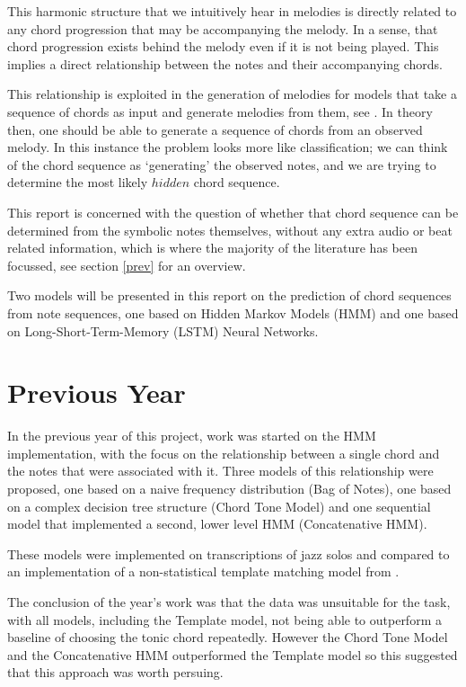 \documentclass[bsc,singlespacing,logo, parskip, deptreport]{infthesis}
\begin{document}
This harmonic structure that we intuitively hear in melodies is directly related to any chord progression that may be accompanying the melody. In a sense, that chord progression exists behind the melody even if it is not being played. This implies a direct relationship between the notes and their accompanying chords.

This relationship is exploited in the generation of melodies for models that take a sequence of chords as input and generate melodies from them, see \cite{biles1994genjam}. In theory then, one should be able to generate a sequence of chords from an observed melody. In this instance the problem looks more like classification; we can think of the chord sequence as `generating' the observed notes, and we are trying to determine the most likely $hidden$ chord sequence.

This report is concerned with the question of whether that chord sequence can be determined from the symbolic notes themselves, without any extra audio or beat related information, which is where the majority of the literature has been focussed, see section \ref{prev} for an overview. 

Two models will be presented in this report on the prediction of chord sequences from note sequences, one based on Hidden Markov Models (HMM) and one based on Long-Short-Term-Memory (LSTM) Neural Networks.

\section{Previous Year}

In the previous year of this project, work was started on the HMM implementation, with the focus on the relationship between a single chord and the notes that were associated with it. Three models of this relationship were proposed, one based on a naive frequency distribution (Bag of Notes), one based on a complex decision tree structure (Chord Tone Model) and one sequential model that implemented a second, lower level HMM (Concatenative HMM).

These models were implemented on transcriptions of jazz solos and compared to an implementation of a non-statistical template matching model from \cite{oudre2009template}.

The conclusion of the year's work was that the data was unsuitable for the task, with all models, including the Template model, not being able to outperform a baseline of choosing the tonic chord repeatedly. However the Chord Tone Model and the Concatenative HMM outperformed the Template model so this suggested that this approach was worth persuing.
\end{document}
